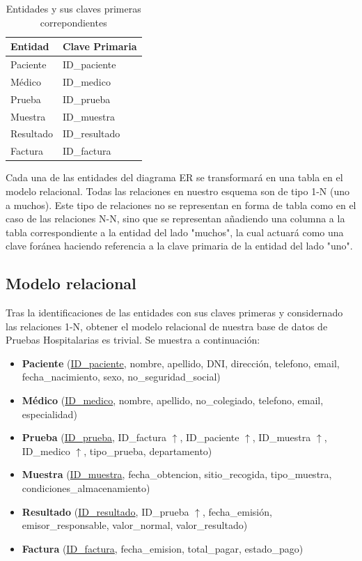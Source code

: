\documentclass[spanish]{article}
\begin{document}
\begin{table}[h]
\center
\caption{Entidades y sus claves primeras correpondientes}
\label{tab:entrelac}
\begin{tabular}{@{}ll@{}}
\toprule
Entidad & Clave Primaria \\ \midrule
Paciente & ID\_paciente \\
Médico & ID\_medico \\
Prueba & ID\_prueba \\
Muestra & ID\_muestra \\
Resultado & ID\_resultado \\
Factura & ID\_factura \\ \bottomrule
\end{tabular}
\end{table}

Cada una de las entidades del diagrama ER se transformará en una tabla en el modelo relacional. Todas las relaciones en nuestro esquema son de tipo 1-N (uno a muchos). Este tipo de relaciones no se representan en forma de tabla como en el caso de las relaciones N-N, sino que se representan añadiendo una columna a la tabla correspondiente a la entidad del lado "muchos", la cual actuará como una clave foránea haciendo referencia a la clave primaria de la entidad del lado "uno".

\subsection{Modelo relacional}
Tras la identificaciones de las entidades con sus claves primeras y considernado las relaciones 1-N, obtener el modelo relacional de nuestra base de datos de Pruebas Hospitalarias es trivial. Se muestra a continuación:

\begin{itemize}
    \item \textbf{Paciente} (\underline{ID\_paciente}, nombre, apellido, DNI, dirección, telefono, email, fecha\_nacimiento, sexo, no\_seguridad\_social)
    \item \textbf{Médico} (\underline{ID\_medico}, nombre, apellido, no\_colegiado, telefono, email, especialidad)
    \item \textbf{Prueba} (\underline{ID\_prueba}, ID\_factura $\uparrow$, ID\_paciente $\uparrow$, ID\_muestra $\uparrow$, ID\_medico $\uparrow$, tipo\_prueba, departamento)
    \item \textbf{Muestra} (\underline{ID\_muestra}, fecha\_obtencion, sitio\_recogida, tipo\_muestra, condiciones\_almacenamiento)
    \item \textbf{Resultado} (\underline{ID\_resultado}, ID\_prueba $\uparrow$, fecha\_emisión, emisor\_responsable, valor\_normal, valor\_resultado)
    \item \textbf{Factura} (\underline{ID\_factura}, fecha\_emision, total\_pagar, estado\_pago)
\end{itemize}
    
\end{document}
